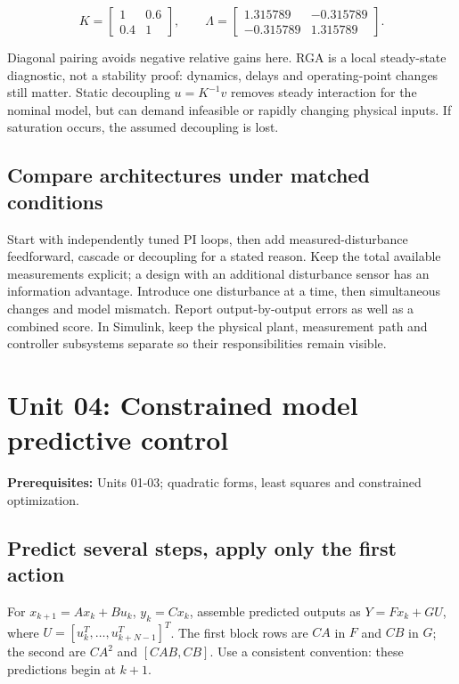 \documentclass[11pt,a4paper]{article}
\begin{document}
\[K=\begin{bmatrix}1&0.6\\0.4&1\end{bmatrix},\qquad \Lambda=\begin{bmatrix}1.315789&-0.315789\\-0.315789&1.315789\end{bmatrix}.\]

Diagonal pairing avoids negative relative gains here. RGA is a local steady-state diagnostic, not a stability proof: dynamics, delays and operating-point changes still matter. Static decoupling $u=K^{-1}v$ removes steady interaction for the nominal model, but can demand infeasible or rapidly changing physical inputs. If saturation occurs, the assumed decoupling is lost.


\subsection{Compare architectures under matched conditions}

Start with independently tuned PI loops, then add measured-disturbance feedforward, cascade or decoupling for a stated reason. Keep the total available measurements explicit; a design with an additional disturbance sensor has an information advantage. Introduce one disturbance at a time, then simultaneous changes and model mismatch. Report output-by-output errors as well as a combined score. In Simulink, keep the physical plant, measurement path and controller subsystems separate so their responsibilities remain visible.

\clearpage\section{Unit 04: Constrained model predictive control}
\textbf{Prerequisites:} Units 01-03; quadratic forms, least squares and constrained optimization.


\subsection{Predict several steps, apply only the first action}

For $x_{k+1}=Ax_k+Bu_k$, $y_k=Cx_k$, assemble predicted outputs as $Y=Fx_k+GU$, where $U=[u_k^T,\ldots,u_{k+N-1}^T]^T$. The first block rows are $CA$ in $F$ and $CB$ in $G$; the second are $CA^2$ and $[CAB,CB]$. Use a consistent convention: these predictions begin at $k+1$.
\end{document}
